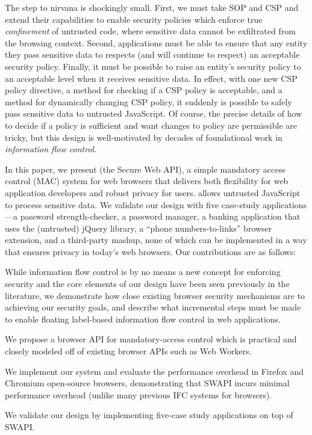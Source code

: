 The step to nirvana is shockingly small.  First, we must take SOP and
CSP and extend their capabilities to enable security policies which
enforce true {\em confinement\/} of untrusted code, where sensitive data
cannot be exfiltrated from the browsing context.  Second, applications
must be able to ensure that any entity they pass sensitive data to
respects (and will continue to respect) an acceptable security policy.
Finally, it must be possible to raise an entity's security policy to an
acceptable level when it receives sensitive data.  In effect, with one new
CSP policy directive, a method for checking if a CSP policy is
acceptable, and a method for dynamically changing CSP policy, it
suddenly is possible to safely pass sensitive data to untrusted
JavaScript.  Of course, the precise details of how to decide if
a policy is sufficient and want changes to policy are permissible
are tricky, but this design is well-motivated by decades of foundational
work in \emph{information flow control}.


In this paper, we present \sys{} (the Secure Web API), a simple
mandatory access control (MAC) system for web browsers that delivers
both flexibility for web application developers and robust privacy for
users. \sys{} allows untrusted JavaScript to process sensitive data.  We
validate our design with five case-study applications---a password
strength-checker, a password manager, a banking application that uses
the (untrusted) jQuery library, a ``phone numbers-to-links'' browser
extension, and a third-party mashup, none of which can be implemented in
a way that ensures privacy in today's web browsers.  Our contributions are as
follows:

\begin{CompactItemize}
\item While information flow control is by no means a new concept for
    enforcing security and the core elements of our design have been
    seen previously in the literature, we demonstrate how close existing
    browser security mechanisms are to achieving our security goals, and
    describe what incremental steps must be made to enable floating label-based
    information flow control in web applications.
\item We propose a browser API for mandatory-access control which is practical
    and closely modeled off of existing browser APIs such as Web Workers.
\item We implement our system and evaluate the performance overhead
    in Firefox and Chromium open-source browsers, demonstrating that
    SWAPI incurs minimal performance overhead (unlike many previous
    IFC systems for browsers).
\item We validate our design by implementing five-case study applications
    on top of SWAPI\@.
\end{CompactItemize}


